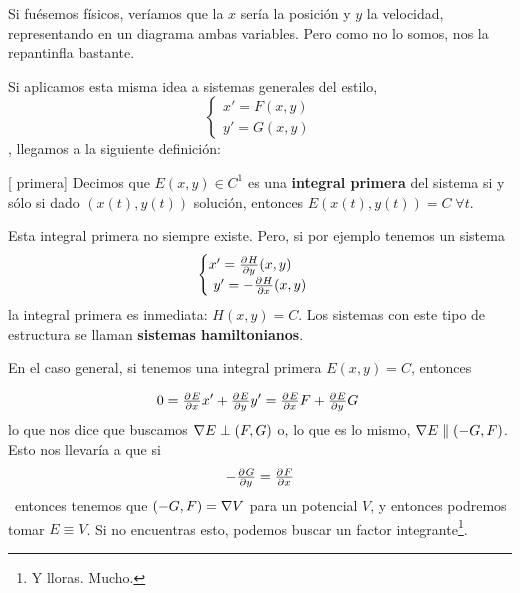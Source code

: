 Si fuésemos físicos, veríamos que la $x$ sería la posición y $y$ la velocidad, representando en un diagrama ambas variables. Pero como no lo somos, nos la repantinfla bastante.


Si aplicamos esta misma idea a sistemas generales del estilo, \[ \begin{cases} x' = F(x,y) \\ y' = G(x,y) \end{cases} \], llegamos a la siguiente definición:

\begin{definition}[ primera] Decimos que $E(x,y) ∈ C^1$ es una \textbf{integral primera} del sistema si y sólo si dado $(x(t),y(t))$ solución, entonces $E(x(t),y(t)) = C\;∀t$.
\end{definition}

Esta integral primera no siempre existe. Pero, si por ejemplo tenemos un sistema \[ \begin{cases} x' = \pd{H}{y}(x,y) \\ y' = -\pd{H}{x}(x,y) \end{cases} \] la integral primera es inmediata: $H(x,y) = C$. Los sistemas con este tipo de estructura se llaman \textbf{sistemas hamiltonianos}.

En el caso general, si tenemos una integral primera $E(x,y) = C$, entonces

\[ 0 = \pd{E}{x}x' + \pd{E}{y} y' = \pd{E}{x}F + \pd{E}{y} G 
\]
lo que nos dice que buscamos $\nabla E \perp (F,G)$ o, lo que es lo mismo, $\nabla E \parallel (-G,F)$. Esto nos llevaría a que si \[ -\pd{G}{y} = \pd{F}{x}\] entonces tenemos que $(-G,F) = \nabla V$ para un potencial $V$, y entonces podremos tomar $E\equiv V$. Si no encuentras esto, podemos buscar un factor integrante\footnote{Y lloras. Mucho.}.


